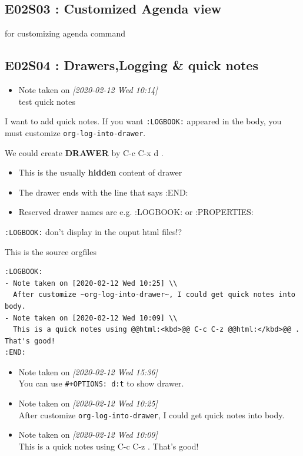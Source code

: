 \documentclass[11pt]{article}
\begin{document}
\subsection{E02S03 : Customized Agenda view}
\label{sec:orga28f32a}
for customizing agenda command 
\subsection{E02S04 : Drawers,Logging \& quick notes}
\label{sec:org37a406b}
\begin{itemize}
\item Note taken on \textit{[2020-02-12 Wed 10:14] } \\
test quick notes
\end{itemize}
I want to add quick notes. If you want \texttt{:LOGBOOK:} appeared in the body, you
must customize \texttt{org-log-into-drawer}.

We could create \textbf{DRAWER} by  C-c C-x d  .

\begin{itemize}
\item This is the usually \textbf{hidden} content of drawer
\item The drawer ends with the line that says :END:
\item Reserved drawer names are e.g. :LOGBOOK: or :PROPERTIES:
\end{itemize}
\texttt{:LOGBOOK:} don't display in the ouput html files!? 

This is the source orgfiles
\begin{verbatim}
:LOGBOOK:
- Note taken on [2020-02-12 Wed 10:25] \\
  After customize ~org-log-into-drawer~, I could get quick notes into body.
- Note taken on [2020-02-12 Wed 10:09] \\
  This is a quick notes using @@html:<kbd>@@ C-c C-z @@html:</kbd>@@ . That's good!
:END:
\end{verbatim}

\begin{itemize}
\item Note taken on \textit{[2020-02-12 Wed 15:36] } \\
You can use \texttt{\#+OPTIONS: d:t} to show drawer.
\item Note taken on \textit{[2020-02-12 Wed 10:25] } \\
After customize \texttt{org-log-into-drawer}, I could get quick notes into body.
\item Note taken on \textit{[2020-02-12 Wed 10:09] } \\
This is a quick notes using  C-c C-z  . That's good!
\end{itemize}
\end{document}
